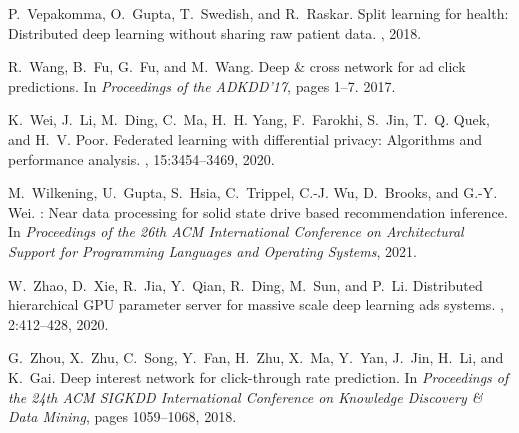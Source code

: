 \documentclass{article}
\begin{document}
\begin{thebibliography}{10}
P.~Vepakomma, O.~Gupta, T.~Swedish, and R.~Raskar.
\newblock Split learning for health: Distributed deep learning without sharing
  raw patient data.
, 2018.

R.~Wang, B.~Fu, G.~Fu, and M.~Wang.
\newblock Deep \& cross network for ad click predictions.
\newblock In {\em Proceedings of the ADKDD'17}, pages 1--7. 2017.

K.~Wei, J.~Li, M.~Ding, C.~Ma, H.~H. Yang, F.~Farokhi, S.~Jin, T.~Q. Quek, and
  H.~V. Poor.
\newblock Federated learning with differential privacy: Algorithms and
  performance analysis.
,
  15:3454--3469, 2020.

M.~Wilkening, U.~Gupta, S.~Hsia, C.~Trippel, C.-J. Wu, D.~Brooks, and G.-Y.
  Wei.
: Near data processing for solid state drive based
  recommendation inference.
\newblock In {\em Proceedings of the 26th ACM International Conference on
  Architectural Support for Programming Languages and Operating Systems}, 2021.

W.~Zhao, D.~Xie, R.~Jia, Y.~Qian, R.~Ding, M.~Sun, and P.~Li.
\newblock Distributed hierarchical {GPU} parameter server for massive scale
  deep learning ads systems.
, 2:412--428, 2020.

G.~Zhou, X.~Zhu, C.~Song, Y.~Fan, H.~Zhu, X.~Ma, Y.~Yan, J.~Jin, H.~Li, and
  K.~Gai.
\newblock Deep interest network for click-through rate prediction.
\newblock In {\em Proceedings of the 24th ACM SIGKDD International Conference
  on Knowledge Discovery \& Data Mining}, pages 1059--1068, 2018.

\end{thebibliography}
\end{document}
